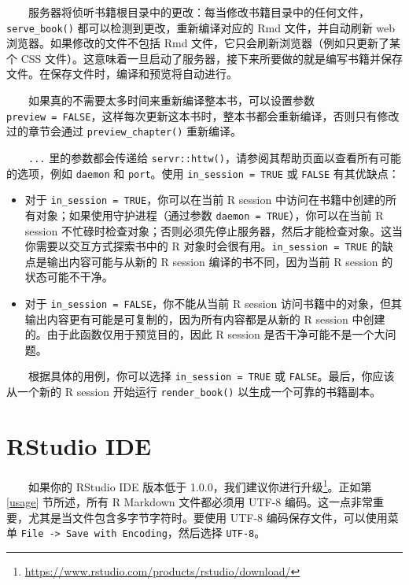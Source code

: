 \documentclass[
  12pt,
]{krantz}
\providecommand{\tightlist}{%
  \setlength{\itemsep}{0pt}\setlength{\parskip}{0pt}}
\renewcommand{\href}[2]{#2\footnote{\url{#1}}}
\theoremstyle{definition}
\theoremstyle{definition}
\theoremstyle{definition}
\theoremstyle{definition}
\theoremstyle{remark}
\begin{document}
  服务器将侦听书籍根目录中的更改：每当修改书籍目录中的任何文件，\texttt{serve\_book()} 都可以检测到更改，重新编译对应的 Rmd 文件，并自动刷新 web 浏览器。如果修改的文件不包括 Rmd 文件，它只会刷新浏览器（例如只更新了某个 CSS 文件）。这意味着一旦启动了服务器，接下来所要做的就是编写书籍并保存文件。在保存文件时，编译和预览将自动进行。

  如果真的不需要太多时间来重新编译整本书，可以设置参数 \texttt{preview\ =\ FALSE}，这样每次更新这本书时，整本书都会重新编译，否则只有修改过的章节会通过 \texttt{preview\_chapter()} 重新编译。

  \texttt{...} 里的参数都会传递给 \texttt{servr::httw()}，请参阅其帮助页面以查看所有可能的选项，例如 \texttt{daemon} 和 \texttt{port}。使用 \texttt{in\_session\ =\ TRUE} 或 \texttt{FALSE} 有其优缺点：

\begin{itemize}
\tightlist
\item
  对于 \texttt{in\_session\ =\ TRUE}，你可以在当前 R session 中访问在书籍中创建的所有对象；如果使用守护进程（通过参数 \texttt{daemon\ =\ TRUE}），你可以在当前 R session 不忙碌时检查对象；否则必须先停止服务器，然后才能检查对象。这当你需要以交互方式探索书中的 R 对象时会很有用。\texttt{in\_session\ =\ TRUE} 的缺点是输出内容可能与从新的 R session 编译的书不同，因为当前 R session 的状态可能不干净。
\item
  对于 \texttt{in\_session\ =\ FALSE}，你不能从当前 R session 访问书籍中的对象，但其输出内容更有可能是可复制的，因为所有内容都是从新的 R session 中创建的。由于此函数仅用于预览目的，因此 R session 是否干净可能不是一个大问题。
\end{itemize}

  根据具体的用例，你可以选择 \texttt{in\_session\ =\ TRUE} 或 \texttt{FALSE}。最后，你应该从一个新的 R session 开始运行 \texttt{render\_book()} 以生成一个可靠的书籍副本。

\hypertarget{rstudio-ide}{%
\section{RStudio IDE}\label{rstudio-ide}}

  如果你的 RStudio IDE 版本低于 1.0.0，我们建议你进行\href{https://www.rstudio.com/products/rstudio/download/}{升级}。正如第 \ref{usage} 节所述，所有 R Markdown 文件都必须用 UTF-8 编码。这一点非常重要，尤其是当文件包含多字节字符时。要使用 UTF-8 编码保存文件，可以使用菜单 \texttt{File\ -\textgreater{}\ Save\ with\ Encoding}，然后选择 \texttt{UTF-8}。
\end{document}
